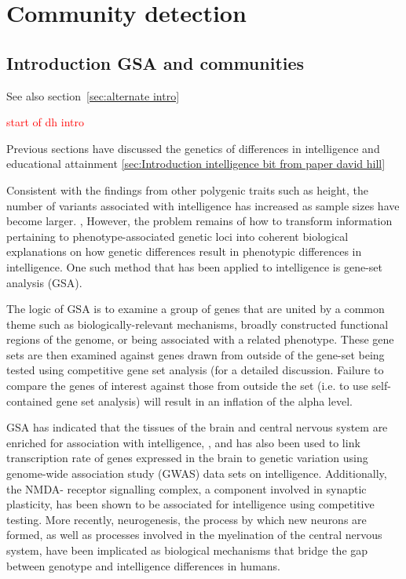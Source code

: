 
\chapter{Community detection}
\label{chap:community detection}


\section{Introduction GSA and communities}
\label{sec: community detection intro gsa}

See also section~\ref{sec:alternate intro}

\textcolor{red}{start of dh intro}

Previous sections have discussed the genetics of differences in intelligence and educational attainment \ref{sec:Introduction intelligence bit from paper david hill}

Consistent with the findings from other polygenic traits such as height, \cite{wood2014defining}  the number of variants associated with intelligence has increased as sample sizes have become larger. \cite{sniekers2017genome},\cite{hill2019combined}  However, the problem remains of how to transform information pertaining to phenotype-associated genetic loci into coherent biological explanations on how genetic differences result in phenotypic differences in intelligence. One such method that has been applied to intelligence is gene-set analysis (GSA). 

The logic of GSA is to examine a group of genes that are united by a common theme such as biologically-relevant mechanisms, \cite{hill2014human}  broadly constructed functional regions of the genome, \cite{hill2016molecular}  or being associated with a related phenotype. \cite{hill2016examining}  These gene sets are then examined against genes drawn from outside of the gene-set being tested using competitive gene set analysis (for a detailed discussion. \cite{de2016statistical}  Failure to compare the genes of interest against those from outside the set (i.e. to use self-contained gene set analysis) will result in an inflation of the alpha level. \cite{de2016statistical} 

GSA has indicated that the tissues of the brain and central nervous system are enriched for association with intelligence, \cite{hill2016molecular},\cite{johnson2016systems}  and has also been used to link transcription rate of genes expressed in the brain to genetic variation using genome-wide association study (GWAS) data sets on intelligence. \cite{hill2019combined}  Additionally, the NMDA- receptor signalling complex, a component involved in synaptic plasticity, has been shown to be associated for intelligence using competitive testing. \cite{hill2014human}  More recently, neurogenesis, the process by which new neurons are formed, as well as processes involved in the myelination of the central nervous system, have been implicated as biological mechanisms that bridge the gap between genotype and intelligence differences in humans. \cite{hill2019combined}  

